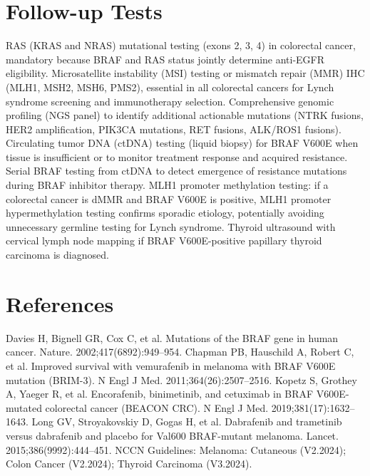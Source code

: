 \section*{Follow-up Tests}
RAS (KRAS and NRAS) mutational testing (exons 2, 3, 4) in colorectal cancer, mandatory because BRAF and RAS status jointly determine anti-EGFR eligibility. Microsatellite instability (MSI) testing or mismatch repair (MMR) IHC (MLH1, MSH2, MSH6, PMS2), essential in all colorectal cancers for Lynch syndrome screening and immunotherapy selection. Comprehensive genomic profiling (NGS panel) to identify additional actionable mutations (NTRK fusions, HER2 amplification, PIK3CA mutations, RET fusions, ALK/ROS1 fusions). Circulating tumor DNA (ctDNA) testing (liquid biopsy) for BRAF V600E when tissue is insufficient or to monitor treatment response and acquired resistance. Serial BRAF testing from ctDNA to detect emergence of resistance mutations during BRAF inhibitor therapy. MLH1 promoter methylation testing: if a colorectal cancer is dMMR and BRAF V600E is positive, MLH1 promoter hypermethylation testing confirms sporadic etiology, potentially avoiding unnecessary germline testing for Lynch syndrome. Thyroid ultrasound with cervical lymph node mapping if BRAF V600E-positive papillary thyroid carcinoma is diagnosed.

\section*{References}
Davies H, Bignell GR, Cox C, et al. Mutations of the BRAF gene in human cancer. Nature. 2002;417(6892):949--954. Chapman PB, Hauschild A, Robert C, et al. Improved survival with vemurafenib in melanoma with BRAF V600E mutation (BRIM-3). N Engl J Med. 2011;364(26):2507--2516. Kopetz S, Grothey A, Yaeger R, et al. Encorafenib, binimetinib, and cetuximab in BRAF V600E-mutated colorectal cancer (BEACON CRC). N Engl J Med. 2019;381(17):1632--1643. Long GV, Stroyakovskiy D, Gogas H, et al. Dabrafenib and trametinib versus dabrafenib and placebo for Val600 BRAF-mutant melanoma. Lancet. 2015;386(9992):444--451. NCCN Guidelines: Melanoma: Cutaneous (V2.2024); Colon Cancer (V2.2024); Thyroid Carcinoma (V3.2024).

\clearpage
